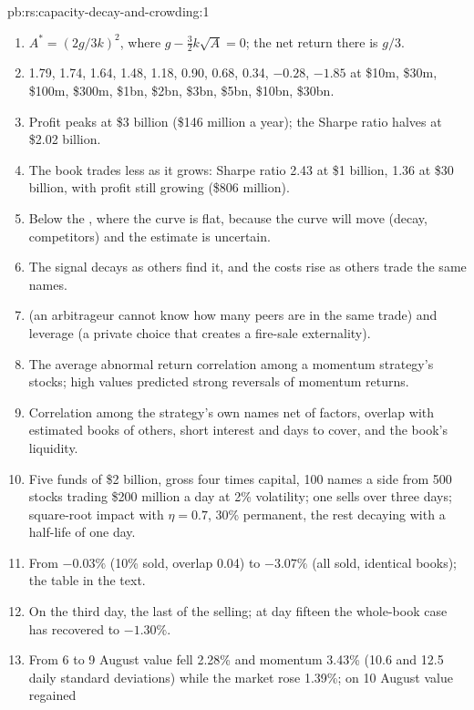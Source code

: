\begin{solution}{pb:rs:capacity-decay-and-crowding:1}
\begin{enumerate}
\item $A^* = (2g/3k)^2$, where $g - \frac32 k\sqrt A = 0$; the net return there is $g/3$.
\item 1.79, 1.74, 1.64, 1.48, 1.18, 0.90, 0.68, 0.34, $-0.28$, $-1.85$ at \$10m, \$30m, \$100m, \$300m, \$1bn, \$2bn, \$3bn, \$5bn, \$10bn, \$30bn.
\item Profit peaks at \$3 billion (\$146 million a year); the Sharpe ratio halves at \$2.02 billion.
\item The book trades less as it grows: Sharpe ratio 2.43 at \$1 billion, 1.36 at \$30 billion, with profit still growing (\$806 million).
\item Below the , where the curve is flat, because the curve will move (decay, competitors) and the estimate is uncertain.
\item The signal decays as others find it, and the costs rise as others trade the same names.
\item {} (an arbitrageur cannot know how many peers are in the same trade) and leverage (a private choice that creates a fire-sale externality).
\item The average abnormal return correlation among a momentum strategy's stocks; high values predicted strong reversals of momentum returns.
\item Correlation among the strategy's own names net of factors, overlap with estimated books of others, short interest and days to cover, and the book's liquidity.
\item Five funds of \$2 billion, gross four times capital, 100 names a side from 500 stocks trading \$200 million a day at 2\% volatility; one sells over three days;
square-root impact with $\eta = 0.7$, 30\% permanent, the rest decaying with a half-life of one day.
\item From $-0.03\%$ (10\% sold, overlap 0.04) to $-3.07\%$ (all sold, identical books); the table in the text.
\item On the third day, the last of the selling; at day fifteen the whole-book case has recovered to $-1.30\%$.
\item From 6 to 9 August value fell 2.28\% and momentum 3.43\% (10.6 and 12.5 daily standard deviations) while the market rose 1.39\%; on 10 August value regained

\end{enumerate}
\end{solution}
